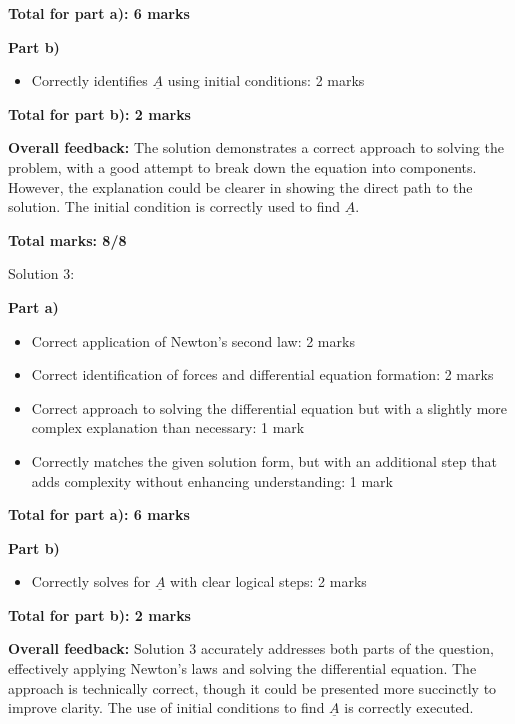 \documentclass[a4paper,11pt]{article}
\begin{document}
\textbf{Total for part a): 6 marks}

\textbf{Part b)}

\begin{itemize}
    \item Correctly identifies \( \underline{A} \) using initial conditions: 2 marks
\end{itemize}

\textbf{Total for part b): 2 marks}

\textbf{Overall feedback:} The solution demonstrates a correct approach to solving the problem, with a good attempt to break down the equation into components. However, the explanation could be clearer in showing the direct path to the solution. The initial condition is correctly used to find \( \underline{A} \).

\textbf{Total marks: 8/8}

Solution 3:

\textbf{Part a)}

\begin{itemize}
    \item Correct application of Newton's second law: 2 marks
    \item Correct identification of forces and differential equation formation: 2 marks
    \item Correct approach to solving the differential equation but with a slightly more complex explanation than necessary: 1 mark
    \item Correctly matches the given solution form, but with an additional step that adds complexity without enhancing understanding: 1 mark
\end{itemize}

\textbf{Total for part a): 6 marks}

\textbf{Part b)}

\begin{itemize}
    \item Correctly solves for \( \underline{A} \) with clear logical steps: 2 marks
\end{itemize}

\textbf{Total for part b): 2 marks}

\textbf{Overall feedback:} Solution 3 accurately addresses both parts of the question, effectively applying Newton's laws and solving the differential equation. The approach is technically correct, though it could be presented more succinctly to improve clarity. The use of initial conditions to find \( \underline{A} \) is correctly executed.
\end{document}
